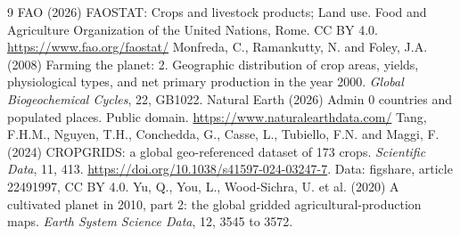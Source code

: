 \documentclass[11pt,a4paper]{article}
\begin{document}
\begin{thebibliography}{9}
 FAO (2026) FAOSTAT: Crops and livestock products; Land use. Food and Agriculture Organization of the United Nations, Rome. CC BY 4.0. \url{https://www.fao.org/faostat/}
 Monfreda, C., Ramankutty, N. and Foley, J.A. (2008) Farming the planet: 2. Geographic distribution of crop areas, yields, physiological types, and net primary production in the year 2000. \emph{Global Biogeochemical Cycles}, 22, GB1022.
 Natural Earth (2026) Admin 0 countries and populated places. Public domain. \url{https://www.naturalearthdata.com/}
 Tang, F.H.M., Nguyen, T.H., Conchedda, G., Casse, L., Tubiello, F.N. and Maggi, F. (2024) CROPGRIDS: a global geo-referenced dataset of 173 crops. \emph{Scientific Data}, 11, 413. \url{https://doi.org/10.1038/s41597-024-03247-7}. Data: figshare, article 22491997, CC BY 4.0.
 Yu, Q., You, L., Wood-Sichra, U. et al. (2020) A cultivated planet in 2010, part 2: the global gridded agricultural-production maps. \emph{Earth System Science Data}, 12, 3545 to 3572.
\end{thebibliography}
\end{document}
